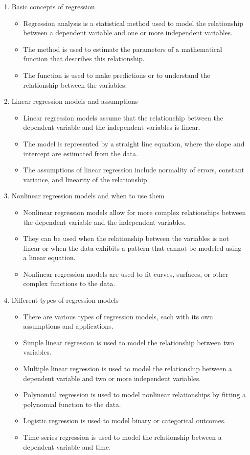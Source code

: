 \documentclass{article}
\begin{document}
\begin{enumerate}[label=\alph*)]
\item Basic concepts of regression
\begin{itemize}
\item Regression analysis is a statistical method used to model the relationship between a dependent variable and one or more independent variables.
\item The method is used to estimate the parameters of a mathematical function that describes this relationship.
\item The function is used to make predictions or to understand the relationship between the variables.
\end{itemize}

\item Linear regression models and assumptions
\begin{itemize}
\item Linear regression models assume that the relationship between the dependent variable and the independent variables is linear.
\item The model is represented by a straight line equation, where the slope and intercept are estimated from the data.
\item The assumptions of linear regression include normality of errors, constant variance, and linearity of the relationship.
\end{itemize}

\item Nonlinear regression models and when to use them
\begin{itemize}
\item Nonlinear regression models allow for more complex relationships between the dependent variable and the independent variables.
\item They can be used when the relationship between the variables is not linear or when the data exhibits a pattern that cannot be modeled using a linear equation.
\item Nonlinear regression models are used to fit curves, surfaces, or other complex functions to the data.
\end{itemize}

\item Different types of regression models
\begin{itemize}
\item There are various types of regression models, each with its own assumptions and applications.
\item Simple linear regression is used to model the relationship between two variables.
\item Multiple linear regression is used to model the relationship between a dependent variable and two or more independent variables.
\item Polynomial regression is used to model nonlinear relationships by fitting a polynomial function to the data.
\item Logistic regression is used to model binary or categorical outcomes.
\item Time series regression is used to model the relationship between a dependent variable and time.
\end{itemize}


\end{enumerate}
\end{document}
